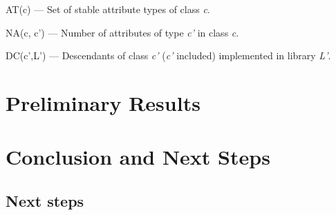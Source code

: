 \documentclass[a4paper]{article}
\begin{document}
AT(c) --- Set of stable attribute types of class \textit{c}.

NA(c, c') --- Number of attributes of type \textit{c'} in class \textit{c}.

DC(c',L') --- Descendants of class \textit{c'} (\textit{c'} included) implemented in library \textit{L'}.



\section{Preliminary Results}



\section{Conclusion and Next Steps}


\subsection{Next steps}




\end{document}
